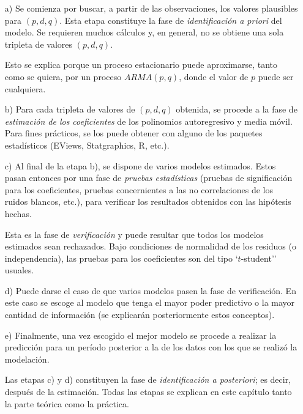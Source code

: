 \begin{enumerate}
\item[a)] Se comienza por buscar, a partir de las observaciones, los valores plausibles para $(p,d,q)$. Esta etapa constituye la fase de \emph{identificaci\'{o}n a priori} del modelo. Se requieren muchos c\'{a}lculos y, en general, no se obtiene una sola tripleta de valores $(p,d,q)$.\newline

Esto se explica porque un proceso estacionario puede aproximarse, tanto como se quiera, por un proceso $ARMA(p,q)$, donde el valor de $p$ puede ser cualquiera.

\item[b)] Para cada tripleta de valores de $(p,d,q)$ obtenida, se procede a la fase de \emph{estimaci\'{o}n de los coeficientes} de los polinomios autoregresivo y media m\'{o}vil. Para fines pr\'{a}cticos, se los puede obtener con alguno de los paquetes estad\'{i}sticos (EViews, Statgraphics, R, etc.).

\item[c)] Al final de la etapa b), se dispone de varios modelos estimados. Estos pasan entonces por una fase de \emph{pruebas estad\'{i}sticas} (pruebas de significaci\'{o}n para los coeficientes, pruebas concernientes a las no correlaciones de los ruidos blancos, etc.), para verificar los resultados obtenidos con las hip\'{o}tesis hechas.\newline

Esta es la fase de \emph{verificaci\'{o}n} y puede resultar que todos los modelos estimados sean rechazados. Bajo condiciones de normalidad de los residuos (o independencia), las pruebas para los coeficientes son del tipo `$t$-student'' usuales.

\item[d)] Puede darse el caso de que varios modelos pasen la fase de verificaci\'{o}n. En este caso se escoge al modelo que tenga el mayor poder predictivo o la mayor cantidad de informaci\'{o}n (se explicar\'{a}n posteriormente estos conceptos).

\item[e)] Finalmente, una vez escogido el mejor modelo se procede a realizar la predicci\'{o}n para un per\'{i}odo posterior a la de los datos con los que se realiz\'{o} la modelaci\'{o}n.\newline

Las etapas c) y d) constituyen la fase  de \emph{identificaci\'{o}n a posteriori}; es decir, despu\'{e}s de la estimaci\'{o}n. Todas las etapas se explican en este cap\'{i}tulo tanto la parte te\'{o}rica como la pr\'{a}ctica.
\end{enumerate}


